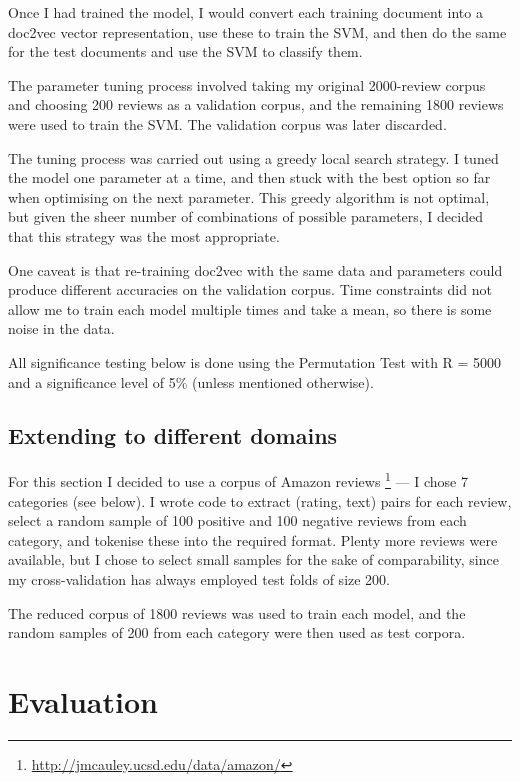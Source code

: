 \documentclass[12pt,a4paper,twoside,twocolumn]{article}
\begin{document}
Once I had trained the model, I would convert each training document into a doc2vec vector representation, use these to train the SVM, and then do the same for the test documents and use the SVM to classify them.

The parameter tuning process involved taking my original 2000-review corpus and choosing 200 reviews as a validation corpus, and the remaining 1800 reviews were used to train the SVM. The validation corpus was later discarded.

The tuning process was carried out using a greedy local search strategy. I tuned the model one parameter at a time, and then stuck with the best option so far when optimising on the next parameter. This greedy algorithm is not optimal, but given the sheer number of combinations of possible parameters, I decided that this strategy was the most appropriate.

One caveat is that re-training doc2vec with the same data and parameters could produce different accuracies on the validation corpus. Time constraints did not allow me to train each model multiple times and take a mean, so there is some noise in the data.

All significance testing below is done using the Permutation Test with R = 5000 and a significance level of 5\% (unless mentioned otherwise).

\subsection{Extending to different domains}

For this section I decided to use a corpus of Amazon reviews \footnote{\url{http://jmcauley.ucsd.edu/data/amazon/}} --- I chose 7 categories (see below). I wrote code to extract (rating, text) pairs for each review, select a random sample of 100 positive and 100 negative reviews from each category, and tokenise these into the required format. Plenty more reviews were available, but I chose to select small samples for the sake of comparability, since my cross-validation has always employed test folds of size 200.

The reduced corpus of 1800 reviews was used to train each model, and the random samples of 200 from each category were then used as test corpora.


\section{Evaluation}
\end{document}
